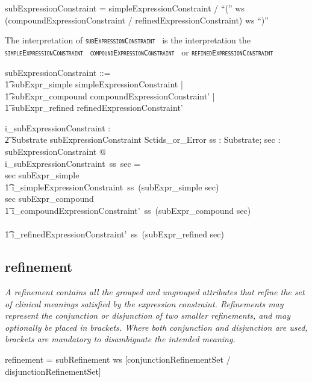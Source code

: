 \documentclass{article}
\def\spec#1{{\tt \small \textsc{{#1}} }}
\def\bnf#1{{\scriptsize {{#1}} }}
\def\desc#1{{\small \textsl{{#1}} }}
\begin{document}
\begin{framed}
\noindent
\bnf{subExpressionConstraint = simpleExpressionConstraint / ``('' ws (compoundExpressionConstraint / refinedExpressionConstraint)  ws ``)''}
\end{framed}

The interpretation of \spec{subExpressionConstraint} is  the interpretation the \spec{simpleExpressionConstraint} \spec{compoundExpressionConstraint} or \spec{refinedExpressionConstraint}

\begin{zed}
subExpressionConstraint ::= \\
\t1 subExpr\_simple \ldata simpleExpressionConstraint \rdata | \\
\t1 subExpr\_compound \ldata compoundExpressionConstraint' \rdata | \\
\t1 subExpr\_refined \ldata refinedExpressionConstraint' \rdata
\end{zed}

\begin{axdef}
   i\_subExpressionConstraint : \\
\t2 Substrate \fun subExpressionConstraint \fun Sctids\_or\_Error
\where
   \forall ss : Substrate; sec : subExpressionConstraint @ \\
i\_subExpressionConstraint~ss~sec = \\
   \IF sec \in \ran subExpr\_simple \THEN \\
   \t1 i\_simpleExpressionConstraint~ss~(subExpr\_simple \inv sec) \\
    \ELSE \IF sec \in \ran subExpr\_compound \THEN \\
    \t1 i\_compoundExpressionConstraint'~ss~(subExpr\_compound \inv sec) \\
    \ELSE \\
    \t1 i\_refinedExpressionConstraint'~ss~(subExpr\_refined \inv sec) 
\end{axdef}

\subsection{refinement}
\begin{framed}
\desc{A refinement contains all the grouped and ungrouped attributes that refine the set of clinical meanings satisfied by the expression constraint. Refinements may represent the conjunction or disjunction of two smaller refinements, and may optionally be placed in brackets. Where both conjunction and disjunction are used, brackets are mandatory to disambiguate the intended meaning.}
\end{framed}
\begin{framed}
\noindent
\bnf{refinement = subRefinement ws [conjunctionRefinementSet / disjunctionRefinementSet]}
\end{framed}
\end{document}
